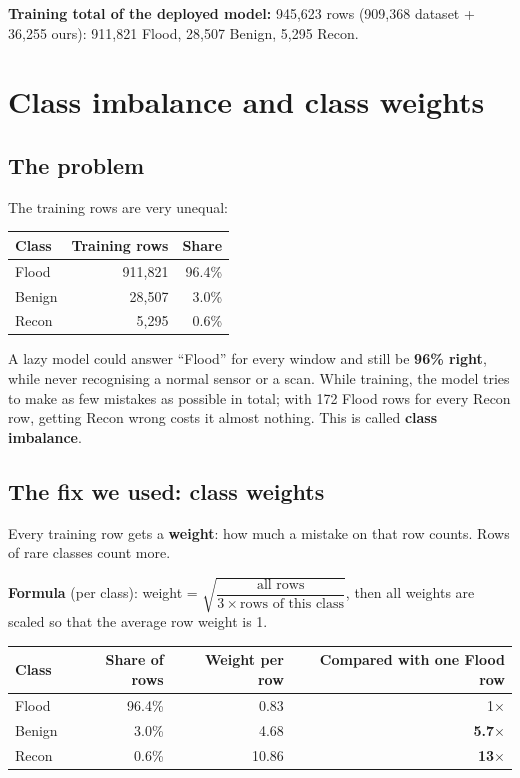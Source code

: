 \documentclass[11pt,a4paper]{article}
\newcommand{\tablestart}{\Needspace{8\baselineskip}}
\begin{document}
\textbf{Training total of the deployed model:} 945,623 rows (909,368 dataset + 36,255 ours): 911,821 Flood, 28,507
Benign, 5,295 Recon.

\section{Class imbalance and class weights}\label{sec:weights}

\subsection{The problem}

The training rows are very unequal:

\tablestart
\begin{center}
\begin{tabular}{lrr}
\toprule
Class & Training rows & Share \\
\midrule
Flood & 911,821 & 96.4\% \\
Benign & 28,507 & 3.0\% \\
Recon & 5,295 & 0.6\% \\
\bottomrule
\end{tabular}
\end{center}

A lazy model could answer ``Flood'' for every window and still be \textbf{96\% right}, while never recognising a
normal sensor or a scan. While training, the model tries to make as few mistakes as possible in total; with 172
Flood rows for every Recon row, getting Recon wrong costs it almost nothing. This is called \textbf{class
imbalance}.

\subsection{The fix we used: class weights}

Every training row gets a \textbf{weight}: how much a mistake on that row counts. Rows of rare classes count more.

\textbf{Formula} (per class): weight = $\sqrt{\dfrac{\text{all rows}}{3 \times \text{rows of this class}}}$, then
all weights are scaled so that the average row weight is 1.

\tablestart
\begin{center}
\begin{tabular}{lrrr}
\toprule
Class & Share of rows & Weight per row & Compared with one Flood row \\
\midrule
Flood & 96.4\% & 0.83 & 1$\times$ \\
Benign & 3.0\% & 4.68 & \textbf{5.7$\times$} \\
Recon & 0.6\% & 10.86 & \textbf{13$\times$} \\
\bottomrule
\end{tabular}
\end{center}
\end{document}
